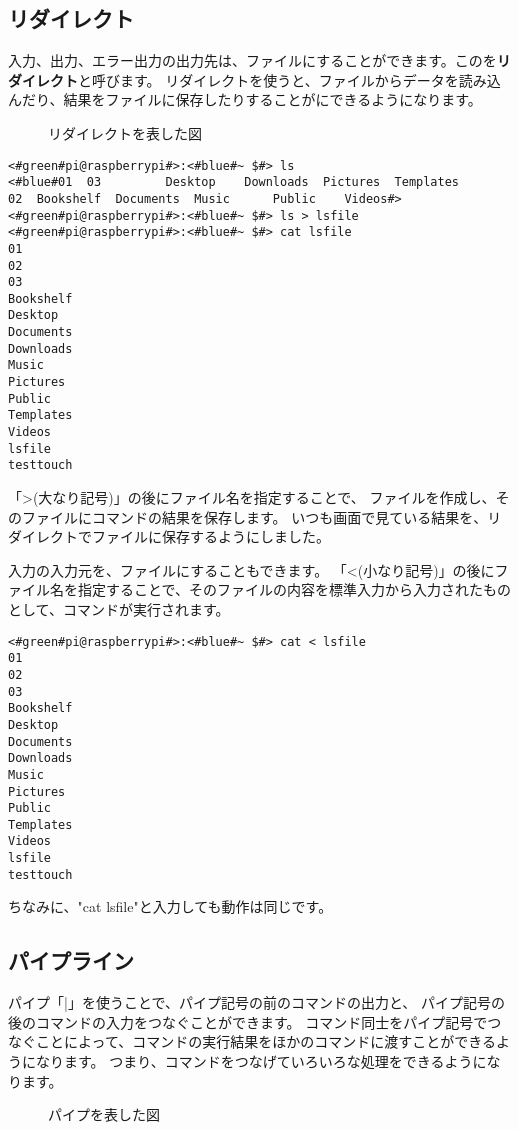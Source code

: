\subsection{リダイレクト}
入力、出力、エラー出力の出力先は、ファイルにすることができます。このを{\bf リダイレクト}と呼びます。
リダイレクトを使うと、ファイルからデータを読み込んだり、結果をファイルに保存したりすることがにできるようになります。
\begin{figure}
    \centering
    
    \caption{リダイレクトを表した図}
    \label{ch03:redirect}
\end{figure}
\begin{lstlisting}[caption=lsの出力をリダイレクトする, label=redirectLs]
<#green#pi@raspberrypi#>:<#blue#~ $#> ls 
<#blue#01  03         Desktop    Downloads  Pictures  Templates
02  Bookshelf  Documents  Music      Public    Videos#>
<#green#pi@raspberrypi#>:<#blue#~ $#> ls > lsfile
<#green#pi@raspberrypi#>:<#blue#~ $#> cat lsfile
01
02
03
Bookshelf
Desktop
Documents
Downloads
Music
Pictures
Public
Templates
Videos
lsfile
testtouch
\end{lstlisting}

「>(大なり記号)」の後にファイル名を指定することで、
ファイルを作成し、そのファイルにコマンドの結果を保存します。
いつも画面で見ている結果を、リダイレクトでファイルに保存するようにしました。

入力の入力元を、ファイルにすることもできます。
「<(小なり記号)」の後にファイル名を指定することで、そのファイルの内容を標準入力から入力されたものとして、コマンドが実行されます。
\begin{lstlisting}[caption=catコマンドにリダイレクトでファイルを入力する, label=redirectCat]
<#green#pi@raspberrypi#>:<#blue#~ $#> cat < lsfile
01
02
03
Bookshelf
Desktop
Documents
Downloads
Music
Pictures
Public
Templates
Videos
lsfile
testtouch
\end{lstlisting}

ちなみに、"cat lsfile"と入力しても動作は同じです。

\subsection{パイプライン}\label{sec:pipelne}

パイプ「|」を使うことで、パイプ記号の前のコマンドの出力と、
パイプ記号の後のコマンドの入力をつなぐことができます。
コマンド同士をパイプ記号でつなぐことによって、コマンドの実行結果をほかのコマンドに渡すことができるようになります。
つまり、コマンドをつなげていろいろな処理をできるようになります。
\begin{figure}[h]
    \centering
    
    \caption{パイプを表した図}
    \label{ch03:pipe}
\end{figure}

